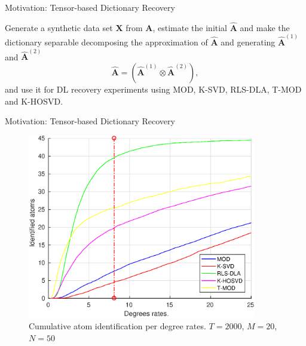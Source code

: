 \documentclass[newPxFont, numfooter, sectionpages]{beamer}
\begin{document}
\begin{frame}[c]{Motivation: Tensor-based Dictionary Recovery}

	Generate a synthetic data set $\textbf{X}$ from $\textbf{A}$, estimate the initial $\hat{\textbf{A}}$ and make the dictionary separable decomposing the approximation of $\hat{\textbf{A}}$ and generating $\hat{\textbf{A}}^{(1)}$ and $\hat{\textbf{A}}^{(2)}$
	\begin{equation}\label{eq:4_eq04}
		\hat{\textbf{A}} = (\hat{\textbf{A}}^{(1)} \otimes \hat{\textbf{A}}^{(2)}),
	\end{equation}
	and use it for DL recovery experiments using MOD, K-SVD, RLS-DLA, T-MOD and K-HOSVD. 

\end{frame}
\begin{frame}[c]{Motivation: Tensor-based Dictionary Recovery}
	\begin{figure}[!htb]
		\centering 
		\includegraphics[width=10cm]{../figures/ch4/s=5_snr=20_L=2000_noIt=100_N=20_K=50.eps}
		\caption{Cumulative atom identification per degree rates. $T=2000$, $M=20$, $N=50$}
		\label{fig:fig1}
	\end{figure}
\end{frame}
\end{document}
